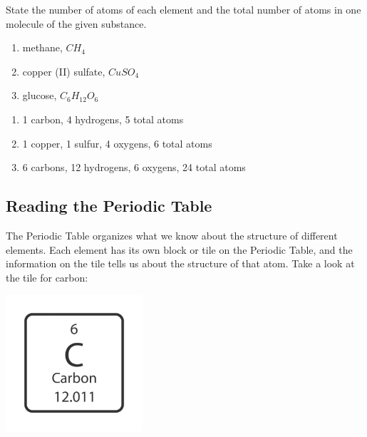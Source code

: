 \begin{Exercise}[title = {Numbers of Atoms in Molecules}, label = num_atom]
State the number of atoms of each element and the total number of atoms in one
molecule of the given substance.
\begin{enumerate}
\item methane, $CH_4$
\item copper (II) sulfate, $CuSO_4$
\item glucose, $C_6H_{12}O_6$
\end{enumerate}
\end{Exercise}

\begin{Answer}[ref = num_atom]
\begin{enumerate}
\item 1 carbon, 4 hydrogens, 5 total atoms
\item 1 copper, 1 sulfur, 4 oxygens, 6 total atoms
\item 6 carbons, 12 hydrogens, 6 oxygens, 24 total atoms
\end{enumerate}
\end{Answer}

\subsection{Reading the Periodic Table}
The Periodic Table organizes what we know about the structure of different
elements. Each element has its own block or tile on the Periodic Table, and the
information on the tile tells us about the structure of that atom. Take a look at
the tile for carbon:

\begin{center}
\includegraphics[width=2in]{carbon_tile.png}
\end{center}

